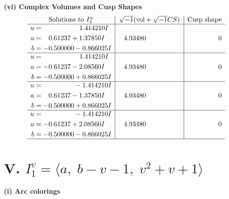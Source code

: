 \documentclass[1p]{elsarticle_modified}
\theoremstyle{definition}
\newcommand{\I}{\sqrt{-1}}
\begin{document}
\newpage\flushleft \textbf{(vi) Complex Volumes and Cusp Shapes}
$$\begin{array}{c|c|c}  
\text{Solutions to }I^u_{4}& \I (\text{vol} + \sqrt{-1}CS) & \text{Cusp shape}\\
 \hline 
\begin{aligned}
u &= \phantom{-0.000000 -}1.414210 I \\
a &= \phantom{-}0.61237 + 1.37850 I \\
b &= -0.500000 - 0.866025 I\end{aligned}
 & \phantom{-}4.93480\phantom{ +0.000000I} & \phantom{-0.000000 } 0 \\ \hline\begin{aligned}
u &= \phantom{-0.000000 -}1.414210 I \\
a &= -0.61237 - 2.08560 I \\
b &= -0.500000 + 0.866025 I\end{aligned}
 & \phantom{-}4.93480\phantom{ +0.000000I} & \phantom{-0.000000 } 0 \\ \hline\begin{aligned}
u &= \phantom{-0.000000 } -1.414210 I \\
a &= \phantom{-}0.61237 - 1.37850 I \\
b &= -0.500000 + 0.866025 I\end{aligned}
 & \phantom{-}4.93480\phantom{ +0.000000I} & \phantom{-0.000000 } 0 \\ \hline\begin{aligned}
u &= \phantom{-0.000000 } -1.414210 I \\
a &= -0.61237 + 2.08560 I \\
b &= -0.500000 - 0.866025 I\end{aligned}
 & \phantom{-}4.93480\phantom{ +0.000000I} & \phantom{-0.000000 } 0\\
 \hline 
 \end{array}$$\newpage\newpage\renewcommand{\arraystretch}{1}
\centering \section*{V. $I^v_{1}= \langle a,\;b- v-1,\;v^2+v+1 \rangle$}
\flushleft \textbf{(i) Arc colorings}\\
\end{document}
